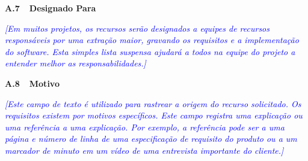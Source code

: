 \documentclass[a4paper]{article}
\begin{document}
\hypertarget{ijgx8duep97t}{}\textbf{A.7\ \ Designado Para}

\textit{\textcolor{blue}{[Em muitos projetos, os recursos ser\~ao designados a {\textquotedbl}equipes de
recursos{\textquotedbl} respons\'aveis por uma extra\c{c}\~ao maior, gravando os requisitos e a implementa\c{c}\~ao do
software. Esta simples lista suspensa ajudar\'a a todos na equipe do projeto a entender melhor as responsabilidades.]}}

\hypertarget{lmiid6nq4bwf}{}\textbf{A.8\ \ Motivo}

\textit{\textcolor{blue}{[Este campo de texto \'e utilizado para rastrear a origem do recurso solicitado. Os requisitos
existem por motivos espec\'ificos. Este campo registra uma explica\c{c}\~ao ou uma refer\^encia a uma explica\c{c}\~ao.
Por exemplo, a refer\^encia pode ser a uma p\'agina e n\'umero de linha de uma especifica\c{c}\~ao de requisito do
produto ou a um marcador de minuto em um v\'ideo de uma entrevista importante do cliente.]}}


\bigskip


\bigskip


\bigskip
\end{document}
